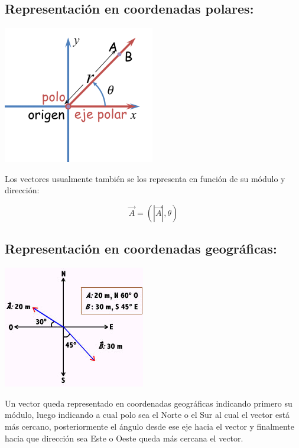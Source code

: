\documentclass[a5paper,pagesize,10pt,bibtotoc,pointlessnumbers,
normalheadings,DIV=9,fleqn,x11names,table,twoside=false]{scrbook}
\begin{document}
\subsection{Representación en coordenadas polares:}

\begin{center}
 \includegraphics[scale = 0.77]{images/picture1-0.png}
\end{center}

Los vectores usualmente también se los representa en función de su módulo y dirección:

\begin{equation}
 \vec{A} = (|\vec{A}|, \theta)
\end{equation}

\subsection{Representación en coordenadas geográficas:}

\begin{center}
 \includegraphics[angle=0.5]{images/vector2.jpg}
\end{center}

Un vector queda representado en coordenadas geográficas indicando primero su módulo, luego indicando a cual polo sea el 
Norte o el Sur al cual el vector está más cercano, posteriormente el ángulo desde ese eje hacia el vector y finalmente 
hacia que dirección sea Este o Oeste queda más cercana el vector.
\end{document}
